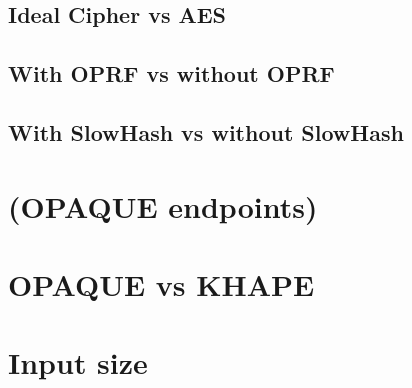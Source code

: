 \documentclass[../report.tex]{subfiles}
\begin{document}
\subsection{Ideal Cipher vs AES} %

\subsection{With OPRF vs without OPRF} %

\subsection{With SlowHash vs without SlowHash} %


\section{(OPAQUE endpoints)} %


\section{OPAQUE vs KHAPE} %


\section{Input size} %
\end{document}
